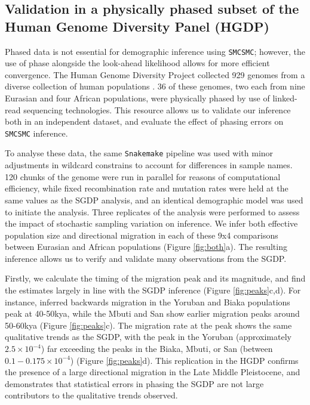 \documentclass{article}
\begin{document}
\subsection{Validation in a physically phased subset of the Human Genome Diversity Panel (HGDP)} \label{hgdp_section}

Phased data is not essential for demographic inference using {\tt SMCSMC}; however, the use of phase alongside the look-ahead likelihood allows for more efficient convergence. The Human Genome Diversity Project collected 929 genomes from a diverse collection of human populations \cite{Bergstrom2019}. 36 of these genomes, two each from nine Eurasian and four African populations, were physically phased by use of linked-read sequencing technologies. This resource allows us to validate our inference both in an independent dataset, and evaluate the effect of phasing errors on {\tt SMCSMC} inference.   

To analyse these data, the same {\tt Snakemake} pipeline was used with minor adjustments in wildcard constrains to account for differences in sample names. 120 chunks of the genome were run in parallel for reasons of computational efficiency, while fixed recombination rate and mutation rates were held at the same values as the SGDP analysis, and an identical demographic model was used to initiate the analysis. Three replicates of the analysis were performed to assess the impact of stochastic sampling variation on inference. We infer both effective population size and directional migration in each of these 9x4 comparisons between Eurasian and African populations (Figure \ref{fig:both}a). The resulting inference allows us to verify and validate many observations from the SGDP.

Firstly, we calculate the timing of the migration peak and its magnitude, and find the estimates largely in line with the SGDP inference (Figure \ref{fig:peaks}c,d). For instance, inferred backwards migration in the Yoruban and Biaka populations peak at 40-50kya, while the Mbuti and San show earlier migration peaks around 50-60kya (Figure \ref{fig:peaks}c). The migration rate at the peak shows the same qualitative trends as the SGDP, with the peak in the Yoruban (approximately $2.5\times10^{-4}$) far exceeding the peaks in the Biaka, Mbuti, or San (between $0.1-0.175\times10^{-4}$) (Figure \ref{fig:peaks}d). This replication in the HGDP confirms the presence of a large directional migration in the Late Middle Pleistocene, and demonstrates that statistical errors in phasing the SGDP are not large contributors to the qualitative trends observed. 
\end{document}
